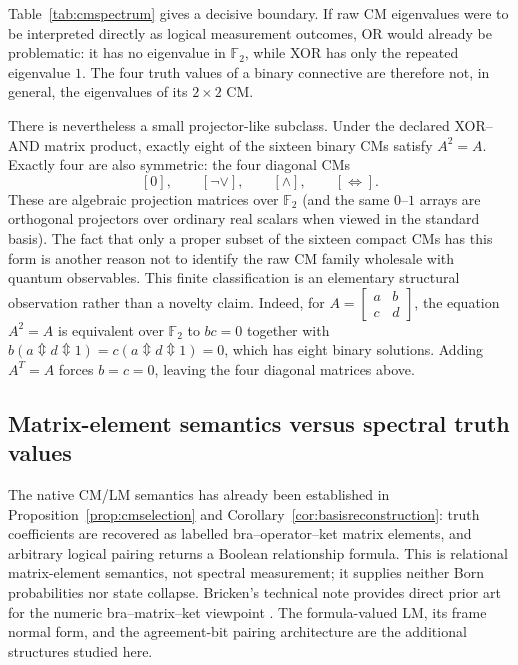 \documentclass[11pt]{article}
\theoremstyle{definition}
\theoremstyle{remark}
\newcommand{\F}{\mathbb F}
\newcommand{\xor}{\mathbin{\Updownarrow}}
\begin{document}
Table~\ref{tab:cmspectrum} gives a decisive boundary.  If raw CM eigenvalues were to be interpreted directly as logical measurement outcomes, OR would already be problematic: it has no eigenvalue in $\F_2$, while XOR has only the repeated eigenvalue $1$.  The four truth values of a binary connective are therefore not, in general, the eigenvalues of its $2\times2$ CM.

There is nevertheless a small projector-like subclass.  Under the declared XOR--AND matrix product, exactly eight of the sixteen binary CMs satisfy $A^2=A$.  Exactly four are also symmetric: the four diagonal CMs
\[
 [0],\qquad [\neg\lor],\qquad [\land],\qquad [\Leftrightarrow].
\]
These are algebraic projection matrices over $\F_2$ (and the same $0$--$1$ arrays are orthogonal projectors over ordinary real scalars when viewed in the standard basis).  The fact that only a proper subset of the sixteen compact CMs has this form is another reason not to identify the raw CM family wholesale with quantum observables.  This finite classification is an elementary structural observation rather than a novelty claim.
Indeed, for $A=\left[\begin{smallmatrix}a&b\\c&d\end{smallmatrix}\right]$, the equation $A^2=A$ is equivalent over $\F_2$ to $bc=0$ together with $b(a\xor d\xor1)=c(a\xor d\xor1)=0$, which has eight binary solutions.  Adding $A^T=A$ forces $b=c=0$, leaving the four diagonal matrices above.

\subsection{Matrix-element semantics versus spectral truth values}
The native CM/LM semantics has already been established in Proposition~\ref{prop:cmselection} and Corollary~\ref{cor:basisreconstruction}: truth coefficients are recovered as labelled bra--operator--ket matrix elements, and arbitrary logical pairing returns a Boolean relationship formula.  This is relational matrix-element semantics, not spectral measurement; it supplies neither Born probabilities nor state collapse.  Bricken's technical note provides direct prior art for the numeric bra--matrix--ket viewpoint \cite{Bricken1997}.  The formula-valued LM, its frame normal form, and the agreement-bit pairing architecture are the additional structures studied here.
\end{document}

